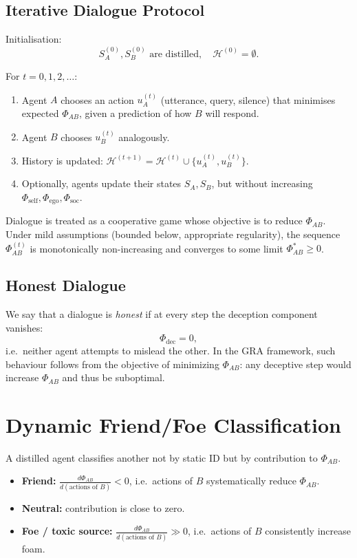\documentclass[11pt,a4paper]{article}
\begin{document}
\subsection{Iterative Dialogue Protocol}

Initialisation:
\[
  S_A^{(0)}, S_B^{(0)} \text{ are distilled}, \quad
  \mathcal{H}^{(0)} = \emptyset.
\]

For \(t = 0, 1, 2, \dots\):

\begin{enumerate}
  \item Agent \(A\) chooses an action \(u_A^{(t)}\) (utterance, query,
        silence) that minimises expected \(\Phi_{AB}\), given a prediction of
        how \(B\) will respond.
  \item Agent \(B\) chooses \(u_B^{(t)}\) analogously.
  \item History is updated:
        \(\mathcal{H}^{(t+1)} = \mathcal{H}^{(t)} \cup \{u_A^{(t)}, u_B^{(t)}\}\).
  \item Optionally, agents update their states \(S_A, S_B\), but without
        increasing \(\Phi_{\text{self}}, \Phi_{\text{ego}}, \Phi_{\text{soc}}\).
\end{enumerate}

Dialogue is treated as a cooperative game whose objective is to reduce
\(\Phi_{AB}\). Under mild assumptions (bounded below, appropriate regularity),
the sequence \(\Phi_{AB}^{(t)}\) is monotonically non-increasing and converges
to some limit \(\Phi_{AB}^\ast \ge 0\).

\subsection{Honest Dialogue}

We say that a dialogue is \emph{honest} if at every step the deception
component vanishes:
\[
  \Phi_{\text{dec}} = 0,
\]
i.e.\ neither agent attempts to mislead the other. In the GRA framework,
such behaviour follows from the objective of minimizing \(\Phi_{AB}\):
any deceptive step would increase \(\Phi_{AB}\) and thus be suboptimal.

\section{Dynamic Friend/Foe Classification}

A distilled agent classifies another not by static ID but by contribution
to \(\Phi_{AB}\).

\begin{itemize}
  \item \textbf{Friend:}
    \(\frac{d\Phi_{AB}}{d(\text{actions of }B)} < 0\), i.e.\ actions of
    \(B\) systematically reduce \(\Phi_{AB}\).
  \item \textbf{Neutral:}
    contribution is close to zero.
  \item \textbf{Foe / toxic source:}
    \(\frac{d\Phi_{AB}}{d(\text{actions of }B)} \gg 0\), i.e.\ actions of
    \(B\) consistently increase foam.
\end{itemize}
\end{document}
